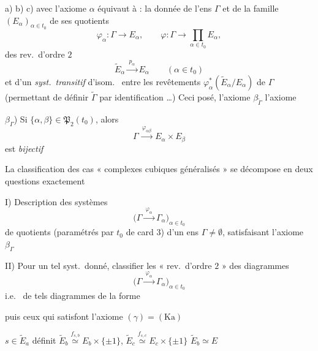 \documentclass[11pt,a4paper]{article}
\begin{document}
a) b) c) avec l'axiome $\alpha$ équivaut à : la donnée de l'ens $\Gamma$
\add{$\neq\emptyset$} et de la famille $(E_\alpha)_{\alpha\in t_0}$ de ses quotients
\[
  \varphi_\alpha:\Gamma\to E_\alpha ,\qquad
  \varphi:\Gamma\to\prod_{\alpha\in t_0}E_\alpha ,
\]
  des rev.\ d'ordre $2$
\[
  \widetilde{E}_\alpha\xrightarrow{\ p_\alpha\ }E_\alpha\qquad(\alpha\in t_0)
\]
et d'un \emph{syst.\ transitif} d'isom.\ \add{$\Gamma$-} entre les revêtements
$\varphi_\alpha^*(\widetilde{E}_\alpha/E_\alpha)$ de $\Gamma$ (permettant de définir
$\widetilde{\Gamma}$ par identification …) Ceci posé, l'axiome
$\beta_{\widetilde{\Gamma}}$   l'axiome

$\beta_\Gamma$) Si $\{\alpha,\beta\}\in\mathfrak{P}_2(t_0)$, alors
\[
  \Gamma\xrightarrow{\ \varphi_{\alpha\beta}\ }E_\alpha\times E_\beta
\]
est \emph{bijectif}

La classification des cas « complexes cubiques généralisés » \struck{\ill{}} se
décompose  en deux questions exactement

I) Description des systèmes
\[
  \bigl(\Gamma\xrightarrow{\ \varphi_\alpha\ }\Gamma_\alpha\bigr)_{\alpha\in t_0}
\]
de quotients (paramétrés par $t_0$ de card $3$) d'un ens
$\Gamma\neq\emptyset$, satisfaisant l'axiome $\beta_\Gamma$

II) Pour un tel syst.\ donné, classifier les « rev.\ d'ordre $2$ » des diagrammes
\[
  \bigl(\Gamma\xrightarrow{\ \varphi_\alpha\ }\Gamma_\alpha\bigr)_{\alpha\in t_0}
\]
i.e.\  de tels diagrammes  de la forme



puis ceux qui satisfont l'axiome $(\gamma)=(\mathrm{Ka})$


$s\in\widetilde{E}_a$ définit
$\widetilde{E}_b\overset{f_{s,b}}{\simeq}E_b\times\{\pm1\}$,
$\widetilde{E}_c\overset{f_{s,c}}{\simeq}E_c\times\{\pm1\}$
\qquad $\widetilde{E}_b\simeq E$
\end{document}
